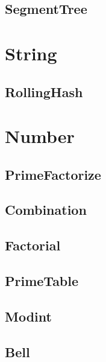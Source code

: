 \documentclass[titlepage, landscape, a4paper, twocolumn, 10pt]{jarticle}
\begin{document}
\subsection{SegmentTree}



\section{String}

\subsection{RollingHash}



\section{Number}

\subsection{PrimeFactorize}


\subsection{Combination}


\subsection{Factorial}


\subsection{PrimeTable}


\subsection{Modint}


\subsection{Bell}

\end{document}
